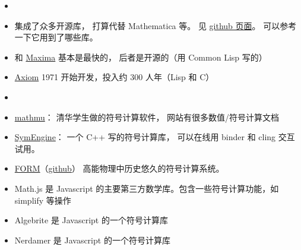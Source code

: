 
\begin{issues}
\issueDraft
\end{issues}

\begin{itemize}
\item {}
\item {} 集成了众多开源库， 打算代替 Mathematica 等。 见 \href{https://github.com/sagemath/sage/}{github 页面}。 可以参考一下它用到了哪些库。
\item  {} 和 \href{https://maxima.sourceforge.io/}{Maxima} 基本是最快的， 后者是开源的（用 Common Lisp 写的）
\item \href{http://www.axiom-developer.org/}{Axiom} 1971 开始开发，投入约 300 人年（Lisp 和 C）
\item {}
\item \href{http://mathmu.github.io/MTCAS/RecentChanges.html}{mathmu}： 清华学生做的符号计算软件， 网站有很多数值/符号计算文档
\item \href{https://github.com/symengine/symengine}{SymEngine}： 一个 C++ 写的符号计算库， 可以在线用 binder 和 cling 交互试用。
\item \href{https://www.nikhef.nl/~form/}{FORM}（\href{https://github.com/vermaseren/form}{github}） 高能物理中历史悠久的符号计算系统。
\item Math.js 是 Javascript 的主要第三方数学库。包含一些符号计算功能，如 simplify 等操作
\item Algebrite 是 Javascript 的一个符号计算库
\item Nerdamer 是 Javascript 的一个符号计算库
\end{itemize}

